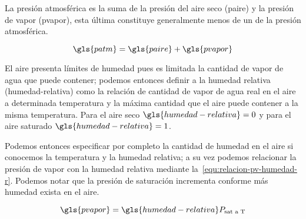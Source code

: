 		La presión atmosférica es la suma de la presión del aire seco (\gls{paire}) y la presión de vapor (\gls{pvapor}), esta última constituye generalmente menos de un  de la presión atmosférica.

		\begin{equation}
			\gls{patm} = \gls{paire} + \gls{pvapor}
		\end{equation}

		El aire presenta límites de humedad pues es limitada la cantidad de vapor de agua que puede contener; podemos entonces definir a la humedad relativa (\gls{humedad-relativa}) como la relación de cantidad de vapor de agua real en el aire a determinada temperatura y la máxima cantidad que el aire puede contener a la misma temperatura. Para el aire seco $\gls{humedad-relativa} = 0$ y para el aire saturado $\gls{humedad-relativa} = 1$.

		Podemos entonces especificar por completo la cantidad de humedad en el aire si conocemos la temperatura y la humedad relativa; a su vez podemos relacionar la presión de vapor con la humedad relativa mediante la~\cref{equ:relacion-pv-humedad-r}. Podemos notar que la presión de saturación incrementa conforme más humedad exista en el aire. \cite{cengel_termodinamica_2009}

		\begin{equation}\label{equ:relacion-pv-humedad-r}
			\gls{pvapor} = \gls{humedad-relativa} P_{\text{sat a T}}
		\end{equation}